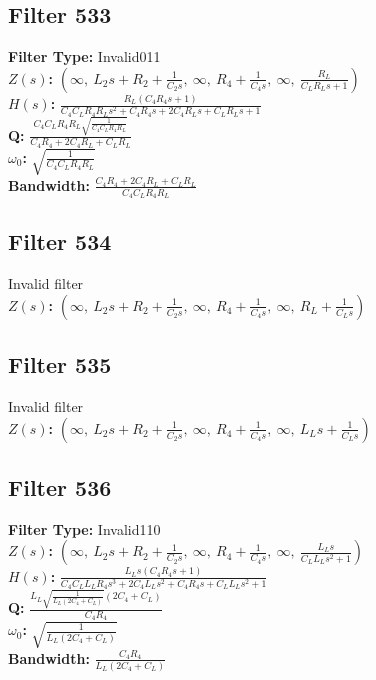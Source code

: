 \documentclass{article}
\begin{document}
\subsection*{Filter 533}
\textbf{Filter Type:} Invalid011 \\ 
\textbf{$Z(s)$:} $\left( \infty, \  L_{2} s + R_{2} + \frac{1}{C_{2} s}, \  \infty, \  R_{4} + \frac{1}{C_{4} s}, \  \infty, \  \frac{R_{L}}{C_{L} R_{L} s + 1}\right)$ \\ 
\textbf{$H(s)$:} $\frac{R_{L} \left(C_{4} R_{4} s + 1\right)}{C_{4} C_{L} R_{4} R_{L} s^{2} + C_{4} R_{4} s + 2 C_{4} R_{L} s + C_{L} R_{L} s + 1}$ \\ 
\textbf{Q:} $\frac{C_{4} C_{L} R_{4} R_{L} \sqrt{\frac{1}{C_{4} C_{L} R_{4} R_{L}}}}{C_{4} R_{4} + 2 C_{4} R_{L} + C_{L} R_{L}}$ \\ 
\textbf{$\omega_0$:} $\sqrt{\frac{1}{C_{4} C_{L} R_{4} R_{L}}}$ \\ 
\textbf{Bandwidth:} $\frac{C_{4} R_{4} + 2 C_{4} R_{L} + C_{L} R_{L}}{C_{4} C_{L} R_{4} R_{L}}$ \\ 
\subsection*{Filter 534}
Invalid filter \\ 
\textbf{$Z(s)$:} $\left( \infty, \  L_{2} s + R_{2} + \frac{1}{C_{2} s}, \  \infty, \  R_{4} + \frac{1}{C_{4} s}, \  \infty, \  R_{L} + \frac{1}{C_{L} s}\right)$ \\ 
\subsection*{Filter 535}
Invalid filter \\ 
\textbf{$Z(s)$:} $\left( \infty, \  L_{2} s + R_{2} + \frac{1}{C_{2} s}, \  \infty, \  R_{4} + \frac{1}{C_{4} s}, \  \infty, \  L_{L} s + \frac{1}{C_{L} s}\right)$ \\ 
\subsection*{Filter 536}
\textbf{Filter Type:} Invalid110 \\ 
\textbf{$Z(s)$:} $\left( \infty, \  L_{2} s + R_{2} + \frac{1}{C_{2} s}, \  \infty, \  R_{4} + \frac{1}{C_{4} s}, \  \infty, \  \frac{L_{L} s}{C_{L} L_{L} s^{2} + 1}\right)$ \\ 
\textbf{$H(s)$:} $\frac{L_{L} s \left(C_{4} R_{4} s + 1\right)}{C_{4} C_{L} L_{L} R_{4} s^{3} + 2 C_{4} L_{L} s^{2} + C_{4} R_{4} s + C_{L} L_{L} s^{2} + 1}$ \\ 
\textbf{Q:} $\frac{L_{L} \sqrt{\frac{1}{L_{L} \left(2 C_{4} + C_{L}\right)}} \left(2 C_{4} + C_{L}\right)}{C_{4} R_{4}}$ \\ 
\textbf{$\omega_0$:} $\sqrt{\frac{1}{L_{L} \left(2 C_{4} + C_{L}\right)}}$ \\ 
\textbf{Bandwidth:} $\frac{C_{4} R_{4}}{L_{L} \left(2 C_{4} + C_{L}\right)}$ \\ 
\end{document}
